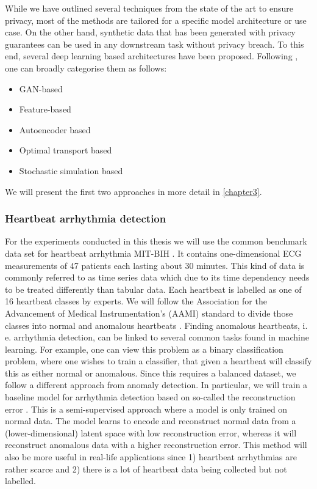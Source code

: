 While we have outlined several techniques from the state of the art to ensure privacy, most of the methods are tailored for a specific model architecture or use case. On the other hand, synthetic data that has been generated with privacy guarantees can be used in any downstream task without privacy breach. To this end, several deep learning based architectures have been proposed. Following \parencite{hu2023sok}, one can broadly categorise them as follows:
\begin{itemize}
    \item GAN-based
    \item Feature-based
    \item Autoencoder based {\tiny \Parencite[see e. g.][for a generator based on a variational autoencoder that is trained with DP-SGD]{vae}}
    \item Optimal transport based {\tiny \Parencite[see e. g.][for generator based on the so-called Sinkhorn divergence]{cao2021dont}}
    \item Stochastic simulation based {\tiny \Parencite[see e. g.][for a differentially-private diffusion model]{dpgen}}
\end{itemize}

We will present the first two approaches in more detail in \cref{chapter3}.

\subsubsection*{Heartbeat arrhythmia detection}
For the experiments conducted in this thesis we will use the common benchmark data set for heartbeat arrhythmia MIT-BIH \parencite{moody2001impact}. It contains one-dimensional ECG measurements of 47 patients each lasting about 30 minutes. This kind of data is commonly referred to as time series data which due to its time dependency needs to be treated differently than tabular data. Each heartbeat is labelled as one of 16 heartbeat classes by experts. We will follow the Association for the Advancement of Medical Instrumentation's (AAMI) standard to divide those classes into normal and anomalous heartbeats \Parencite{aami}. Finding anomalous heartbeats, i. e. arrhythmia detection, can be linked to several common tasks found in machine learning. For example, one can view this problem as a binary classification problem, where one wishes to train a classifier, that given a heartbeat will classify this as either normal or anomalous. Since this requires a balanced dataset, we follow a different approach from anomaly detection. In particular, we will train a baseline model for arrhythmia detection based on so-called the reconstruction error \parencite[see][for an in-depth survey on anomaly detection with times series]{schmidl2022anomaly}. This is a semi-supervised approach where a model is only trained on normal data. The model learns to encode and reconstruct normal data from a (lower-dimensional) latent space with low reconstruction error, whereas it will reconstruct anomalous data with a higher reconstruction error. This method will also be more useful in real-life applications since 1) heartbeat arrhythmias are rather scarce and 2) there is a lot of heartbeat data being collected but not labelled.

